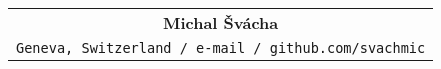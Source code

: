 \begin{tabular*}{1\textwidth}{ c }
    \centerline{\textbf{\LARGE Michal Švácha}} \\
    \centerline{\footnotesize \texttt{{Geneva, Switzerland / e-mail / github.com/svachmic}}} \\
\end{tabular*}
\\
\vspace{0.1in}